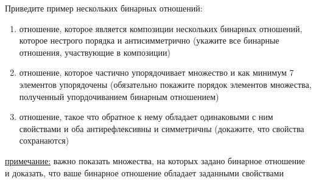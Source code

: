 \question
Приведите  пример  нескольких бинарных отношений:
\begin{enumerate}
	\renewcommand{\labelenumi}{\alph{enumi})}
	\item отношение, которое является композиции нескольких бинарных отношений,  которое  нестрого порядка  и антисимметрично (укажите все бинарные отношения, участвующие в композиции)
	\item отношение, которое частично упорядочивает множество и как минимум 7 элементов упорядочены (обязательно покажите порядок элементов множества, полученный упордочиванием бинарным отношением)
	\item отношение, такое что обратное к нему  обладает одинаковыми с ним свойствами и оба антирефлексивны и симметричны (докажите, что свойства сохранаются)
\end{enumerate}

\underline{примечание:} важно показать  множества, на которых задано бинарное отношение и доказать, что ваше бинарное отношение обладает заданными свойствами
